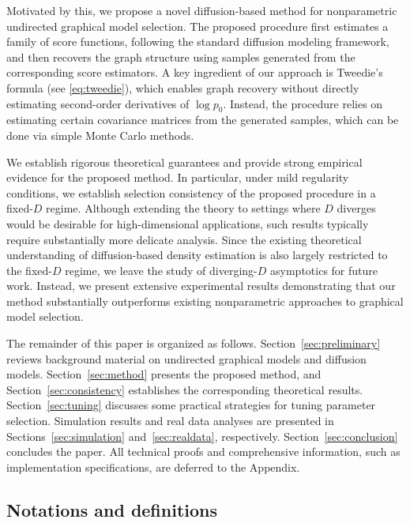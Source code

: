 \documentclass[11pt,a4paper,final]{article}
\numberwithin{equation}{section}
\theoremstyle{remark}
\begin{document}
Motivated by this, we propose a novel diffusion-based method for nonparametric undirected graphical model selection. 
The proposed procedure first estimates a family of score functions, following the standard diffusion modeling framework, and then recovers the graph structure using samples generated from the corresponding score estimators. 
A key ingredient of our approach is Tweedie's formula (see \eqref{eq:tweedie}), which enables graph recovery without directly estimating second-order derivatives of $\log p_0$. 
Instead, the procedure relies on estimating certain covariance matrices from the generated samples, which can be done via simple Monte Carlo methods.

We establish rigorous theoretical guarantees and provide strong empirical evidence for the proposed method.
In particular, under mild regularity conditions, we establish selection consistency of the proposed procedure in a fixed-$D$ regime. 
Although extending the theory to settings where $D$ diverges would be desirable for high-dimensional applications, such results typically require substantially more delicate analysis. 
Since the existing theoretical understanding of diffusion-based density estimation is also largely restricted to the fixed-$D$ regime, we leave the study of diverging-$D$ asymptotics for future work. 
Instead, we present extensive experimental results demonstrating that our method substantially outperforms existing nonparametric approaches to graphical model selection.

The remainder of this paper is organized as follows. 
Section~\ref{sec:preliminary} reviews background material on undirected graphical models and diffusion models. 
Section~\ref{sec:method} presents the proposed method, and Section~\ref{sec:consistency} establishes the corresponding theoretical results. 
Section~\ref{sec:tuning} discusses some practical strategies for tuning parameter selection.
Simulation results and real data analyses are presented in Sections~\ref{sec:simulation} and~\ref{sec:realdata}, respectively. Section~\ref{sec:conclusion} concludes the paper. 
All technical proofs and comprehensive information, such as implementation specifications, are deferred to the Appendix.






\subsection*{Notations and definitions}
\end{document}
